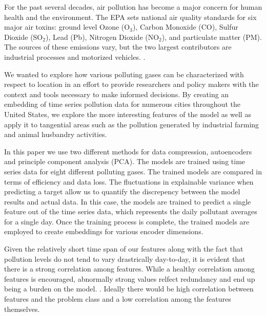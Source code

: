 \documentclass{article}
\begin{document}
\par For the past several decades, air pollution has become a major concern for human health
and the environment. The EPA sets national air quality standards for  six major air
toxins: ground level Ozone (O$_3$), Carbon Monoxide (CO), Sulfur Dioxide (SO$_2$),
Lead (Pb), Nitrogen Dioxide (NO$_2$), and particulate matter (PM). The sources of these emissions vary, but the two largest contributors are industrial processes and motorized vehicles. \parencite{NAAQS09}.
\par We wanted to explore how various polluting gases can be characterized with respect to location in an effort to provide researchers and policy makers with the context and tools necessary to make informed decisions. By creating an embedding of time series pollution data for numerous cities throughout the United States, we explore the more interesting features of the model as well as apply it to tangential areas such as the pollution generated by industrial farming and animal husbandry activities.

\par In this paper we use two different methods for data compression, autoencoders and principle component analysis (PCA). The models are trained using time series data for eight different polluting gases. The trained models are compared in terms of efficiency and data loss. The fluctuations in explainable variance when predicting a target allow us to quantify the discrepency between the model results and actual data. In this case, the models are trained to predict a single feature out of the time series data, which represents the daily pollutant averages for a single day. Once the training process is complete, the trained models are employed to create embeddings for various encoder dimensions. 

\par Given the relatively short time span of our features along with the fact that pollution levels do not tend to vary drastrically day-to-day, it is evident that there is a strong correlation among features. While a healthy correlation among features is encouraged, abnormally strong values
relfect redundancy and end up being a burden on the model. \parencite{featureredundancy}. Ideally there would be high correlation between features and the problem class and a low correlation among the features themselves.
\end{document}
